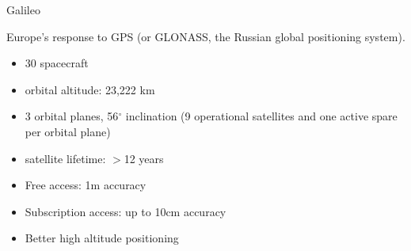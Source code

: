\documentclass[compress]{beamer}
\begin{document}
\begin{frame}{Galileo}

    Europe's response to GPS (or GLONASS, the Russian global positioning
    system).

    \begin{itemize}

        \item 30 spacecraft
        \item orbital altitude: 23,222 km
        \item 3 orbital planes, 56$^{\circ}$ inclination (9 operational satellites and one
            active spare per orbital plane)
        \item satellite lifetime: $>$12 years
    \end{itemize}

    \pause

    \begin{itemize}

        \item Free access: 1m accuracy
        \item Subscription access: up to 10cm accuracy
        \item Better high altitude positioning
    \end{itemize}

\end{frame}
\end{document}

